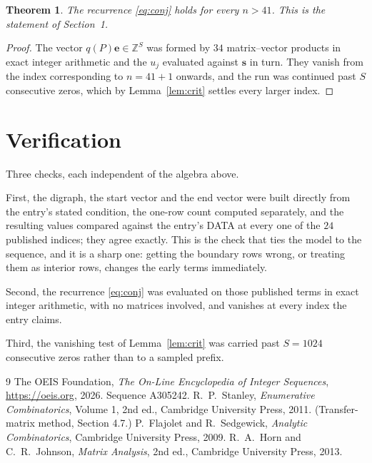 \documentclass[11pt,a4paper]{article}
\theoremstyle{plain}
\newtheorem{theorem}{Theorem}
\theoremstyle{definition}
\begin{document}
\begin{theorem}
The recurrence \eqref{eq:conj} holds for every $n>41$. This is the statement of
Section~1.
\end{theorem}

\begin{proof}
The vector $q(P)\mathbf{e}\in\mathbb{Z}^{S}$ was formed by $34$ matrix--vector
products in exact integer arithmetic and the $u_j$ evaluated against $\mathbf{s}$ in turn.
They vanish from the index corresponding to $n=41+1$ onwards, and the run was continued
past $S$ consecutive zeros, which by Lemma~\ref{lem:crit} settles every larger index.
\end{proof}

\section{Verification}

Three checks, each independent of the algebra above.

First, the digraph, the start vector and the end vector were built directly from the
entry's stated condition, the one-row count computed separately, and the resulting values
compared against the entry's DATA at every one of the $24$ published indices; they
agree exactly. This is the check that ties the model to the sequence, and it is a sharp one:
getting the boundary rows wrong, or treating them as interior rows, changes the early terms
immediately.

Second, the recurrence \eqref{eq:conj} was evaluated on those published terms in exact
integer arithmetic, with no matrices involved, and vanishes at every index the entry claims.

Third, the vanishing test of Lemma~\ref{lem:crit} was carried past $S=1024$ consecutive
zeros rather than to a sampled prefix.

\begin{thebibliography}{9}
 The OEIS Foundation, \emph{The On-Line Encyclopedia of Integer
Sequences}, \url{https://oeis.org}, 2026. Sequence A305242.
 R.~P.~Stanley, \emph{Enumerative Combinatorics}, Volume 1, 2nd ed.,
Cambridge University Press, 2011. (Transfer-matrix method, Section 4.7.)
 P.~Flajolet and R.~Sedgewick, \emph{Analytic Combinatorics}, Cambridge
University Press, 2009.
 R.~A.~Horn and C.~R.~Johnson, \emph{Matrix Analysis}, 2nd ed., Cambridge
University Press, 2013.
\end{thebibliography}
\end{document}
